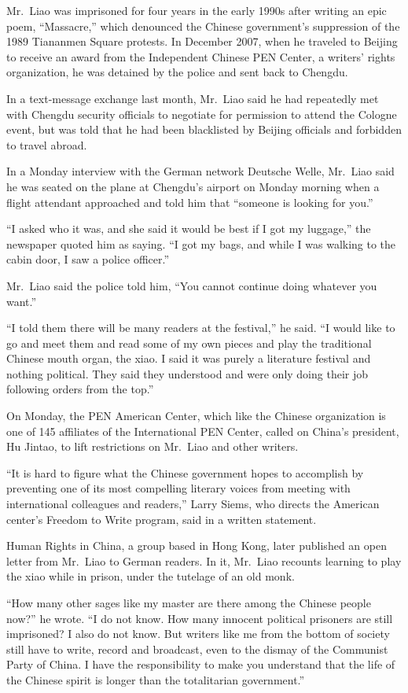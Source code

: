 ﻿\documentclass[12pt]{article}
\begin{document}
Mr.~Liao was imprisoned for four years in the early 1990s after writing an epic poem, ``Massacre,''
which denounced the Chinese government's suppression of the 1989 Tiananmen Square protests. In
December 2007, when he traveled to Beijing to receive an award from the Independent Chinese PEN
Center, a writers' rights organization, he was detained by the police and sent back to Chengdu.

In a text-message exchange last month, Mr.~Liao said he had repeatedly met with Chengdu security
officials to negotiate for permission to attend the Cologne event, but was told that he had been
blacklisted by Beijing officials and forbidden to travel abroad.

In a Monday interview with the German network Deutsche Welle, Mr.~Liao said he was seated on the
plane at Chengdu's airport on Monday morning when a flight attendant approached and told him that
``someone is looking for you.''

``I asked who it was, and she said it would be best if I got my luggage,'' the newspaper quoted him
as saying. ``I got my bags, and while I was walking to the cabin door, I saw a police officer.''

Mr.~Liao said the police told him, ``You cannot continue doing whatever you want.''

``I told them there will be many readers at the festival,'' he said. ``I would like to go and meet
them and read some of my own pieces and play the traditional Chinese mouth organ, the xiao. I said
it was purely a literature festival and nothing political. They said they understood and were only
doing their job following orders from the top.''

On Monday, the PEN American Center, which like the Chinese organization is one of 145 affiliates of
the International PEN Center, called on China's president, Hu Jintao, to lift restrictions on
Mr.~Liao and other writers.

``It is hard to figure what the Chinese government hopes to accomplish by preventing one of its most
compelling literary voices from meeting with international colleagues and readers,'' Larry Siems,
who directs the American center's Freedom to Write program, said in a written statement.

Human Rights in China, a group based in Hong Kong, later published an open letter from Mr.~Liao to
German readers. In it, Mr.~Liao recounts learning to play the xiao while in prison, under the
tutelage of an old monk.

``How many other sages like my master are there among the Chinese people now?'' he wrote. ``I do not
know. How many innocent political prisoners are still imprisoned? I also do not know. But writers
like me from the bottom of society still have to write, record and broadcast, even to the dismay of
the Communist Party of China. I have the responsibility to make you understand that the life of the
Chinese spirit is longer than the totalitarian government.''
\end{document}
